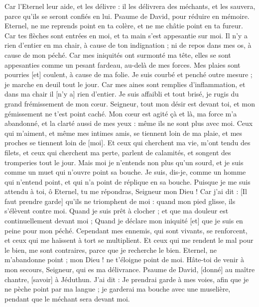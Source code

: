 \begin{multicols}{2}
Car l'Eternel leur aide, et les délivre : il les délivrera des méchants, et les sauvera, parce qu'ils se seront confiés en lui.
\VerseOne{}Psaume de David, pour réduire en mémoire. Eternel, ne me reprends point en ta colère, et ne me châtie point en ta fureur.
Car tes flèches sont entrées en moi, et ta main s'est appesantie sur moi.
Il n'y a rien d'entier en ma chair, à cause de ton indignation ; ni de repos dans mes os, à cause de mon péché.
Car mes iniquités ont surmonté ma tête, elles se sont appesanties comme un pesant fardeau, au-delà de mes forces.
Mes plaies sont pourries [et] coulent, à cause de ma folie.
Je suis courbé et penché outre mesure ; je marche en deuil tout le jour.
Car mes aines sont remplies d'inflammation, et dans ma chair il [n'y a] rien d'entier.
Je suis affaibli et tout brisé, je rugis du grand frémissement de mon cœur.
Seigneur, tout mon désir est devant toi, et mon gémissement ne t'est point caché.
Mon cœur est agité çà et là, ma force m'a abandonné, et la clarté aussi de mes yeux : même ils ne sont plus avec moi.
Ceux qui m'aiment, et même mes intimes amis, se tiennent loin de ma plaie, et mes proches se tiennent loin de [moi].
Et ceux qui cherchent ma vie, m'ont tendu des filets, et ceux qui cherchent ma perte, parlent de calamités, et songent des tromperies tout le jour.
Mais moi je n'entends non plus qu'un sourd, et je suis comme un muet qui n'ouvre point sa bouche.
Je suis, dis-je, comme un homme qui n'entend point, et qui n'a point de réplique en sa bouche.
Puisque je me suis attendu à toi, ô Eternel, tu me répondras, Seigneur mon Dieu !
Car j'ai dit : [Il faut prendre garde] qu'ils ne triomphent de moi : quand mon pied glisse, ils s'élèvent contre moi.
Quand je suis prêt à clocher ; et que ma douleur est continuellement devant moi ;
Quand je déclare mon iniquité [et] que je suis en peine pour mon péché.
Cependant mes ennemis, qui sont vivants, se renforcent, et ceux qui me haïssent à tort se multiplient.
Et ceux qui me rendent le mal pour le bien, me sont contraires, parce que je recherche le bien.
Eternel, ne m'abandonne point ; mon Dieu ! ne t'éloigne point de moi.
Hâte-toi de venir à mon secours, Seigneur, qui es ma délivrance.
\VerseOne{}Psaume de David, [donné] au maître chantre, [savoir] à Jéduthun. J'ai dit : Je prendrai garde à mes voies, afin que je ne pèche point par ma langue ; je garderai ma bouche avec une muselière, pendant que le méchant sera devant moi.

\end{multicols}
